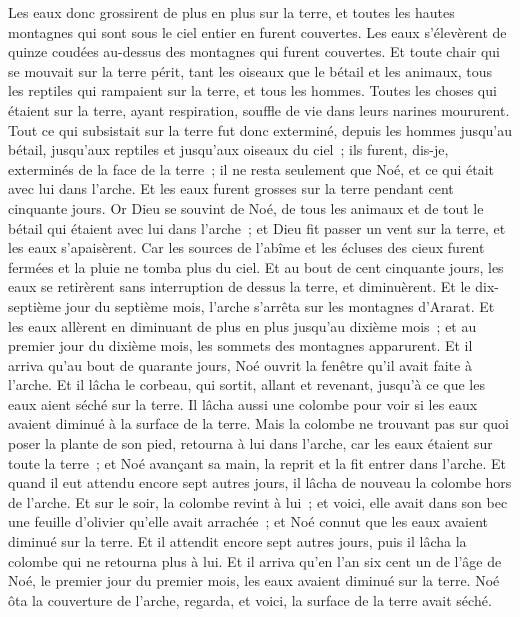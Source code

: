 \begin{multicols}{2}
Les eaux donc grossirent de plus en plus sur la terre, et toutes les hautes montagnes qui sont sous le ciel entier en furent couvertes.
Les eaux s'élevèrent de quinze coudées au-dessus des montagnes qui furent couvertes.
Et toute chair qui se mouvait sur la terre périt, tant les oiseaux que le bétail et les animaux, tous les reptiles qui rampaient sur la terre, et tous les hommes.
Toutes les choses qui étaient sur la terre, ayant respiration, souffle de vie dans leurs narines moururent.
Tout ce qui subsistait sur la terre fut donc exterminé, depuis les hommes jusqu'au bétail, jusqu'aux reptiles et jusqu'aux oiseaux du ciel~; ils furent, dis-je, exterminés de la face de la terre~; il ne resta seulement que Noé, et ce qui était avec lui dans l'arche.
Et les eaux furent grosses sur la terre pendant cent cinquante jours.
\VerseOne{}Or Dieu se souvint de Noé, de tous les animaux et de tout le bétail qui étaient avec lui dans l'arche~; et Dieu fit passer un vent sur la terre, et les eaux s'apaisèrent.
Car les sources de l'abîme et les écluses des cieux furent fermées et la pluie ne tomba plus du ciel.
Et au bout de cent cinquante jours, les eaux se retirèrent sans interruption de dessus la terre, et diminuèrent.
Et le dix-septième jour du septième mois, l'arche s'arrêta sur les montagnes d'Ararat.
Et les eaux allèrent en diminuant de plus en plus jusqu'au dixième mois~; et au premier jour du dixième mois, les sommets des montagnes apparurent.
Et il arriva qu'au bout de quarante jours, Noé ouvrit la fenêtre qu'il avait faite à l'arche.
Et il lâcha le corbeau, qui sortit, allant et revenant, jusqu'à ce que les eaux aient séché sur la terre.
Il lâcha aussi une colombe pour voir si les eaux avaient diminué à la surface de la terre.
Mais la colombe ne trouvant pas sur quoi poser la plante de son pied, retourna à lui dans l'arche, car les eaux étaient sur toute la terre~; et Noé avançant sa main, la reprit et la fit entrer dans l'arche.
Et quand il eut attendu encore sept autres jours, il lâcha de nouveau la colombe hors de l'arche.
Et sur le soir, la colombe revint à lui~; et voici, elle avait dans son bec une feuille d'olivier qu'elle avait arrachée~; et Noé connut que les eaux avaient diminué sur la terre.
Et il attendit encore sept autres jours, puis il lâcha la colombe qui ne retourna plus à lui.
Et il arriva qu'en l'an six cent un de l'âge de Noé, le premier jour du premier mois, les eaux avaient diminué sur la terre. Noé ôta la couverture de l'arche, regarda, et voici, la surface de la terre avait séché.

\end{multicols}
